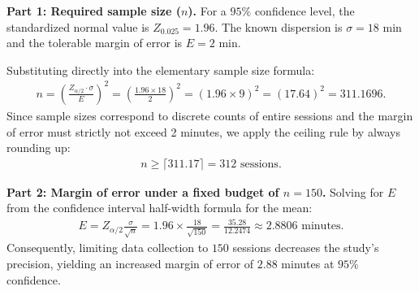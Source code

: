 \begin{solproblema}
	\textbf{Part 1: Required sample size ($n$).}
	For a $95\%$ confidence level, the standardized normal value is $Z_{0.025} = 1.96$. The known dispersion is $\sigma = 18$ min and the tolerable margin of error is $E = 2$ min.
	
	Substituting directly into the elementary sample size formula:
	\begin{align}
		n = \left( \frac{Z_{\alpha/2} \cdot \sigma}{E} \right)^2 = \left( \frac{1.96 \times 18}{2} \right)^2 = (1.96 \times 9)^2 = (17.64)^2 = 311.1696.
	\end{align}
	Since sample sizes correspond to discrete counts of entire sessions and the margin of error must strictly not exceed 2 minutes, we apply the ceiling rule by always rounding up:
	\begin{align}
		n \geq \lceil 311.17 \rceil = 312 \text{ sessions.}
	\end{align}
	
	\textbf{Part 2: Margin of error under a fixed budget of $n = 150$.}
	Solving for $E$ from the confidence interval half-width formula for the mean:
	\begin{align}
		E = Z_{\alpha/2} \frac{\sigma}{\sqrt{n}} = 1.96 \times \frac{18}{\sqrt{150}} = \frac{35.28}{12.2474} \approx 2.8806 \text{ minutes.}
	\end{align}
	Consequently, limiting data collection to $150$ sessions decreases the study's precision, yielding an increased margin of error of $2.88$ minutes at $95\%$ confidence.
\end{solproblema}

